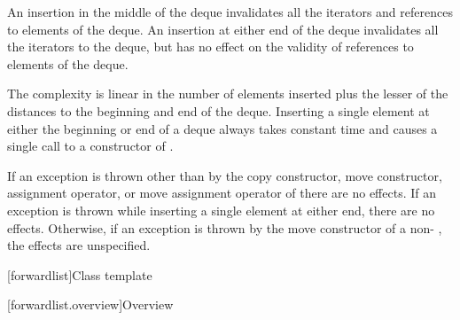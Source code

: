 \documentclass{wg21}
\begin{document}
\begin{itemdescr}
    \pnum
    \effects
    An insertion in the middle of the deque invalidates all the iterators and
    references to elements of the deque.
    An insertion at either end of the
    deque invalidates all the iterators to the deque, but has no effect on
    the validity of references to elements of the deque.
    
    \pnum
    \complexity
    The complexity is linear in the number of elements inserted plus the lesser
    of the distances to the beginning and end of the deque.
    Inserting a single element at either the beginning or end of a deque always takes constant time
    and causes a single call to a constructor of
    .
    
    \pnum
    \remarks
    If an exception is thrown other than by the
    copy constructor, move constructor,
    assignment operator, or move assignment operator of
    there are no effects.
    If an exception is thrown while inserting a single element at either end,
    there are no effects.
    Otherwise, if an exception is thrown by the move constructor of a
    non-
    , the effects are unspecified.
\end{itemdescr}

[forwardlist]{Class template }

[forwardlist.overview]{Overview}
\end{document}
